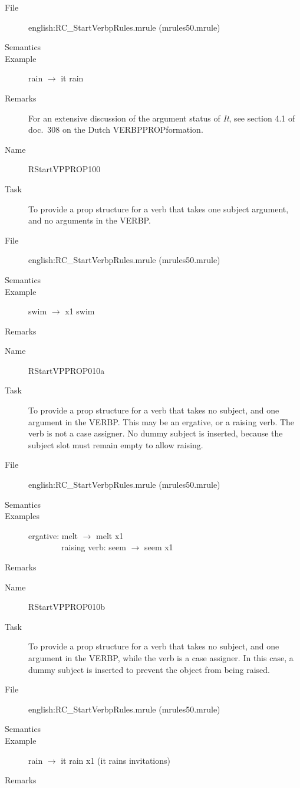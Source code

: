 \begin{description}
\begin{description}
\item[File] english:RC\_StartVerbpRules.mrule (mrules50.mrule)
\item[Semantics]
\item[Example] rain $\rightarrow$ it rain
\item[Remarks] For an extensive discussion of the argument status of 
{\em It\/}, see section 4.1 of doc.\ 308 on the Dutch VERBPPROPformation.
\end{description}

\vspace{1 cm}
\begin{description}
\item[Name] RStartVPPROP100
\item[Task] To provide a prop structure for a verb that takes one subject 
argument, and no arguments in the VERBP.
\item[File] english:RC\_StartVerbpRules.mrule (mrules50.mrule)
\item[Semantics]
\item[Example] swim $\rightarrow$ x1 swim
\item[Remarks]
\end{description}

\vspace{1 cm}
\begin{description}
\item[Name] RStartVPPROP010a
\item[Task] To provide a prop structure for a verb that takes no subject, and 
one argument in the VERBP. This may be an ergative, or a raising verb. The verb 
is not a case assigner. No dummy subject is inserted, because the subject slot 
must remain empty to allow raising.
\item[File] english:RC\_StartVerbpRules.mrule (mrules50.mrule)
\item[Semantics]
\item[Examples] ergative: melt $\rightarrow$ melt x1\\
\ \ \ \ \ \ \ \ raising verb: seem $\rightarrow$ seem x1
\item[Remarks]
\end{description}

\vspace{1 cm}
\begin{description}
\item[Name] RStartVPPROP010b
\item[Task] To provide a prop structure for a verb that takes no subject, and
one argument in the VERBP, while the verb is a case assigner. In this case, a 
dummy subject is inserted to prevent the object from being raised. 
\item[File] english:RC\_StartVerbpRules.mrule (mrules50.mrule)
\item[Semantics]
\item[Example] rain $\rightarrow$ it rain x1 (it rains invitations)
\item[Remarks]
\end{description}


\end{description}
